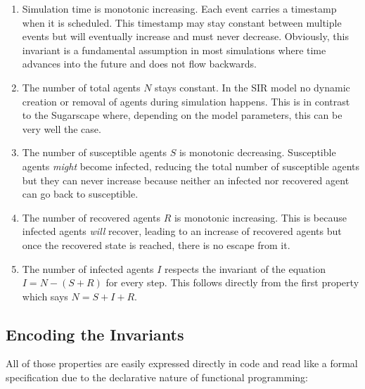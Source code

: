 \begin{enumerate}
	\item Simulation time is monotonic increasing. Each event carries a timestamp when it is scheduled. This timestamp may stay constant between multiple events but will eventually increase and must never decrease. Obviously, this invariant is a fundamental assumption in most simulations where time advances into the future and does not flow backwards.
	
	\item The number of total agents $N$ stays constant. In the SIR model no dynamic creation or removal of agents during simulation happens. This is in contrast to the Sugarscape where, depending on the model parameters, this can be very well the case.
	
	\item The number of susceptible agents $S$ is monotonic decreasing. Susceptible agents \textit{might} become infected, reducing the total number of susceptible agents but they can never increase because neither an infected nor recovered agent can go back to susceptible.
	
	\item The number of recovered agents $R$ is monotonic increasing. This is because infected agents \textit{will} recover, leading to an increase of recovered agents but once the recovered state is reached, there is no escape from it.
	
	\item The number of infected agents $I$ respects the invariant of the equation $I = N - (S + R)$ for every step. This follows directly from the first property which says $N = S + I + R$.
\end{enumerate}

\subsection{Encoding the Invariants}
All of those properties are easily expressed directly in code and read like a formal specification due to the declarative nature of functional programming:

